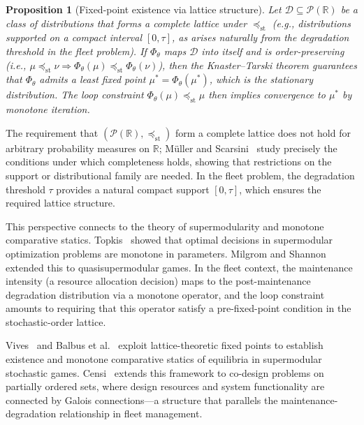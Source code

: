 \documentclass[11pt,a4paper]{article}
\theoremstyle{plain}
\newtheorem{proposition}[theorem]{Proposition}
\theoremstyle{definition}
\theoremstyle{remark}
\begin{document}
\begin{proposition}[Fixed-point existence via lattice structure]
\label{prop:kt}
Let $\mathcal{D} \subseteq \mathcal{P}(\mathbb{R})$ be a class of
distributions that forms a complete lattice under
$\preceq_{\mathrm{st}}$ (e.g., distributions supported on a compact
interval $[0, \tau]$, as arises naturally from the degradation threshold
in the fleet problem).  If $\Phi_\theta$ maps $\mathcal{D}$ into itself
and is order-preserving (i.e., $\mu \preceq_{\mathrm{st}}
\nu \Rightarrow \Phi_\theta(\mu) \preceq_{\mathrm{st}}
\Phi_\theta(\nu)$), then the Knaster--Tarski theorem guarantees that
$\Phi_\theta$ admits a least fixed point
$\mu^* = \Phi_\theta(\mu^*)$, which is the stationary distribution.
The loop constraint $\Phi_\theta(\mu) \preceq_{\mathrm{st}} \mu$ then
implies convergence to $\mu^*$ by monotone iteration.
\end{proposition}

The requirement that $(\mathcal{P}(\mathbb{R}), \preceq_{\mathrm{st}})$
form a complete lattice does not hold for arbitrary probability measures
on $\mathbb{R}$; M\"{u}ller and Scarsini~\cite{muller2006} study
precisely the conditions under which completeness
holds, showing that restrictions on the support or distributional
family are needed.  In the fleet problem, the degradation threshold
$\tau$ provides a natural compact support $[0, \tau]$, which
ensures the required lattice structure.

This perspective connects to the theory of supermodularity and monotone
comparative statics.  Topkis~\cite{topkis1998} showed that optimal
decisions in supermodular optimization problems are monotone in
parameters.  Milgrom and Shannon~\cite{milgrom1994} extended this to
quasisupermodular games.  In the fleet context, the maintenance
intensity (a resource allocation decision) maps to the post-maintenance
degradation distribution via a monotone operator, and the loop
constraint amounts to requiring that this operator satisfy a pre-fixed-point condition
in the stochastic-order lattice.

Vives~\cite{vives1990} and Balbus et al.~\cite{balbus2014} exploit
lattice-theoretic fixed points to establish existence and monotone
comparative statics of equilibria in supermodular stochastic games.
Censi~\cite{censi2015} extends this framework to co-design problems on
partially ordered sets, where design resources and system functionality
are connected by Galois connections---a structure that parallels the
maintenance-degradation relationship in fleet management.
\end{document}
